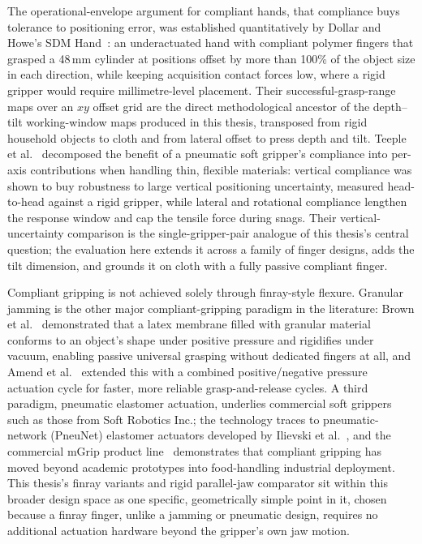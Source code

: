 The operational-envelope argument for compliant hands, that
compliance buys tolerance to positioning error, was established
quantitatively by Dollar and Howe's SDM Hand~\cite{dollar2010sdm}: an
underactuated hand with compliant polymer fingers that grasped a 48\,mm
cylinder at positions offset by more than 100\% of the object size in
each direction, while keeping acquisition contact forces low, where a
rigid gripper would require millimetre-level placement. Their
successful-grasp-range maps over an $xy$ offset grid are the direct
methodological ancestor of the depth--tilt working-window maps produced
in this thesis, transposed from rigid household objects to cloth and
from lateral offset to press depth and tilt.
Teeple et al.~\cite{teeple2022multidimensional} decomposed the benefit of
a pneumatic soft gripper's compliance into per-axis contributions when
handling thin, flexible materials: vertical compliance was shown to buy
robustness to large vertical positioning uncertainty, measured
head-to-head against a rigid gripper, while lateral and rotational
compliance lengthen the response window and cap the tensile force during
snags. Their vertical-uncertainty comparison is the single-gripper-pair
analogue of this thesis's central question; the evaluation here extends it
across a family of finger designs, adds the tilt dimension, and grounds
it on cloth with a fully passive compliant finger.

Compliant gripping is not achieved solely through finray-style flexure.
Granular jamming is the other major compliant-gripping paradigm in the
literature: Brown et al.~\cite{brown2010universal} demonstrated that a
latex membrane filled with granular material conforms to an object's
shape under positive pressure and rigidifies under vacuum, enabling
passive universal grasping without dedicated fingers at all, and Amend et
al.~\cite{amend2012positivepressure} extended this with a combined
positive/negative pressure actuation cycle for faster, more reliable
grasp-and-release cycles. A third paradigm, pneumatic elastomer actuation,
underlies commercial soft grippers such as those from Soft Robotics Inc.;
the technology traces to pneumatic-network (PneuNet) elastomer actuators
developed by Ilievski et al.~\cite{ilievski2011softrobotics}, and the
commercial mGrip product line~\cite{softroboticsinc_mgrip} demonstrates
that compliant gripping has moved beyond academic prototypes into
food-handling industrial deployment. This thesis's finray variants and
rigid parallel-jaw comparator sit within this broader design space as one
specific, geometrically simple point in it, chosen because a finray
finger, unlike a jamming or pneumatic design, requires no additional
actuation hardware beyond the gripper's own jaw motion.

